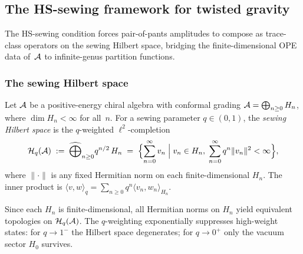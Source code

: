 
\subsection{The HS-sewing framework for twisted gravity}
\label{subsec:thqg-I-hs-sewing-framework}

The HS-sewing condition forces pair-of-pants amplitudes to compose as trace-class operators on the sewing Hilbert space, bridging the finite-dimensional OPE data of~$\mathcal{A}$ to infinite-genus partition functions.

\subsubsection{The sewing Hilbert space}

\begin{definition}
\label{def:thqg-I-sewing-hilbert-space}
Let $\mathcal{A}$ be a positive-energy chiral algebra with conformal grading $\mathcal{A} = \bigoplus_{n \geq 0} H_n$, where $\dim H_n < \infty$ for all~$n$. For a sewing parameter $q \in (0,1)$, the \emph{sewing Hilbert space} is the $q$-weighted $\ell^2$-completion
\begin{equation}\label{eq:thqg-I-sewing-hilbert}
\mathcal{H}_q(\mathcal{A}) \;:=\; \widehat{\bigoplus}_{n \geq 0} q^{n/2}\,H_n \;=\; \Bigl\{ \sum_{n=0}^\infty v_n \;\Big|\; v_n \in H_n,\; \sum_{n=0}^\infty q^n \|v_n\|^2 < \infty \Bigr\},
\end{equation}
where $\|\cdot\|$ is any fixed Hermitian norm on each finite-dimensional $H_n$. The inner product is $\langle v, w \rangle_q = \sum_{n \geq 0} q^n \langle v_n, w_n \rangle_{H_n}$.
\end{definition}

\begin{remark}
\label{rem:thqg-I-norm-independence}
Since each $H_n$ is finite-dimensional, all Hermitian norms on $H_n$ yield equivalent topologies on $\mathcal{H}_q(\mathcal{A})$. The $q$-weighting exponentially suppresses high-weight states: for $q \to 1^-$ the Hilbert space degenerates; for $q \to 0^+$ only the vacuum sector $H_0$ survives.
\end{remark}


